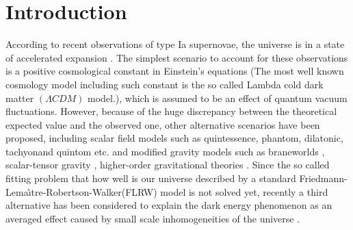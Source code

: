 \documentclass[preprint,preprintnumbers, prd, floatfix,  superscriptaddress,nofootinbib] {revtex4-1}
\begin{document}
\section{Introduction}
\label{intro}
According to recent observations of type Ia supernovae, the universe is in a state of accelerated expansion \cite{riess1998,perlmutter1999measurements}. The simplest scenario to account for these observations is a positive cosmological constant in Einstein's equations (The most well known cosmology model including such constant is the so called Lambda cold dark matter $(\Lambda CDM) $ model.), which is assumed to be an effect of quantum vacuum fluctuations. However, because of the huge discrepancy between the theoretical expected value and the observed one, other alternative scenarios have been proposed, including scalar field models such as quintessence\cite{Caldwell1998Cosmological}, phantom\cite{Caldwell1999A}, dilatonic\cite{Piazza2004Dilatonic}, tachyon\cite{Padmanabhan2002Accelerated}and quintom\cite{Bo2006Oscillating} etc. and modified gravity models such as braneworlds \cite{maartens2010brane}, scalar-tensor gravity \cite{esposito2001scalar}, higher-order gravitational theories \cite{capozziello2005reconciling,das2006curvature}. Since the so called fitting problem that how well is our universe described by a standard Friedmann-Lema\^{\i}tre-Robertson-Walker(FLRW) model is not solved yet, recently a third alternative has been considered to explain the dark energy phenomenon as an averaged effect caused by small scale inhomogeneities of the universe \cite{rasanen2004dark,kolb2006cosmic}.
\end{document}
